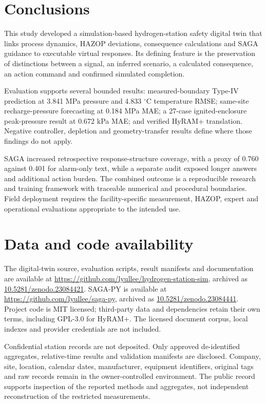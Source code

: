 \documentclass[12pt,a4paper]{article}
\begin{document}
\section{Conclusions}
This study developed a simulation-based hydrogen-station safety digital twin
that links process dynamics, HAZOP deviations, consequence calculations and
SAGA guidance to executable virtual responses. Its defining feature is the
preservation of distinctions between a signal, an inferred scenario, a
calculated consequence, an action command and confirmed simulated completion.

Evaluation supports several bounded results: measured-boundary Type-IV
prediction at 3.841 MPa pressure and 4.833 $^{\circ}$C temperature RMSE;
same-site recharge-pressure forecasting at 0.184 MPa MAE; a 27-case
ignited-enclosure peak-pressure result at 0.672 kPa MAE; and verified HyRAM+
translation. Negative controller, depletion and geometry-transfer results
define where those findings do not apply.

SAGA increased retrospective response-structure coverage, with a proxy of
0.760 against 0.401 for alarm-only text, while a separate audit exposed longer
answers and additional action burden. The combined outcome is a reproducible
research and training framework with traceable numerical and procedural
boundaries. Field deployment requires the facility-specific measurement,
HAZOP, expert and operational evaluations appropriate to the intended use.


\section*{Data and code availability}
The digital-twin source, evaluation scripts, result manifests and documentation
are available at \url{https://github.com/lyullee/hydrogen-station-sim}, archived
as \href{https://doi.org/10.5281/zenodo.23084421}{10.5281/zenodo.23084421}.
SAGA-PY is available at \url{https://github.com/lyullee/saga-py}, archived as
\href{https://doi.org/10.5281/zenodo.23084441}{10.5281/zenodo.23084441}.
Project code is MIT licensed; third-party data and dependencies retain their
own terms, including GPL-3.0 for HyRAM+. The licensed document corpus, local
indexes and provider credentials are not included.

Confidential station records are not deposited. Only approved de-identified
aggregates, relative-time results and validation manifests are disclosed.
Company, site, location, calendar dates, manufacturer, equipment identifiers,
original tags and raw records remain in the owner-controlled environment.
The public record supports inspection of the reported methods and aggregates,
not independent reconstruction of the restricted measurements.
\end{document}
